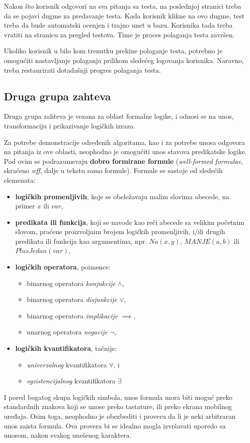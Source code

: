 Nakon što korisnik odgovori na sva pitanja sa testa, na poslednjoj stranici treba da se pojavi dugme za predavanje testa. Kada korisnik klikne na ovo dugme, test treba da bude automatski ocenjen i trajno unet u bazu. Korisnika tada treba vratiti na stranicu za pregled testova. Time je proces polaganja testa završen.

Ukoliko korisnik u bilo kom trenutku prekine polaganje testa, potrebno je omogućiti nastavljanje polaganja prilikom sledećeg logovanja korisnika. Naravno, treba restaurirati dotadašnji progres polaganja testa.

\subsection{Druga grupa zahteva}
Druga grupa zahteva je vezana za oblast formalne logike, i odnosi se na unos, transformaciju i prikazivanje logičkih izraza.

Za potrebe demonstracije određenih algoritama, kao i za potrebe unosa odgovora na pitanja iz ove oblasti, neophodno je omogućiti unos stavova predikatske logike. Pod ovim se podrazumevaju \textbf{dobro formirane formule} (\textit{well-formed formulae}, skraćeno \textit{wff}, dalje u tekstu samo formule). Formule se sastoje od sledećih elemenata:
\begin{itemize}
\item \textbf{logičkih promenljivih}, koje se obeležavaju malim slovima abecede, na primer $x$ ili $var$,
\item \textbf{predikata ili funkcija}, koji se navode kao reči abecede sa velikim početnim slovom, praćene proizvoljnim brojem logičkih promenljivih, i/ili drugih predikata ili funkcija kao argumentima, npr. $\mathit{Na}(x, y)$, $\mathit{MANJE}(a, b)$ ili $\mathit{PlusJedan}(var)$,
\item \textbf{logičkih operatora}, poimence:
\begin{itemize}
\item binarnog operatora \emph{konjukcije} $\land$,
\item binarnog operatora \emph{disjunkcije} $\lor$,
\item binarnog operatora \emph{implikacije} $\implies$,
\item unarnog operatora \emph{negacije} $\neg$,
\end{itemize}
\item \textbf{logičkih kvantifikatora}, tačnije:
\begin{itemize}
\item \emph{univerzalnog} kvantifikatora $\forall$, i
\item \emph{egzistencijalnog} kvantifikatora $\exists$
\end{itemize}
\end{itemize}
I pored bogatog skupa logičkih simbola, unos formula mora biti moguć preko standardnih znakova koji se unose preko tastature, ili preko ekrana mobilnog uređaja. Osim toga, neophodno je obezbediti i proveru da li je neki arbitraran unos zaista formula. Ova provera bi se idealno mogla izvršavati uporedo sa unosom, nakon svakog unešenog karaktera.

